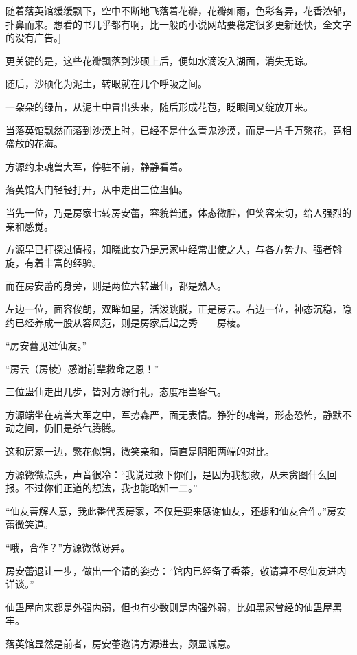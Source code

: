 
\begin{this_body}

随着落英馆缓缓飘下，空中不断地飞落着花瓣，花瓣如雨，色彩各异，花香浓郁，扑鼻而来。想看的书几乎都有啊，比一般的小说网站要稳定很多更新还快，全文字的没有广告。]

更关键的是，这些花瓣飘落到沙硕上后，便如水滴没入湖面，消失无踪。

随后，沙硕化为泥土，转眼就在几个呼吸之间。

一朵朵的绿苗，从泥土中冒出头来，随后形成花苞，眨眼间又绽放开来。

当落英馆飘然而落到沙漠上时，已经不是什么青鬼沙漠，而是一片千万繁花，竞相盛放的花海。

方源约束魂兽大军，停驻不前，静静看着。

落英馆大门轻轻打开，从中走出三位蛊仙。

当先一位，乃是房家七转房安蕾，容貌普通，体态微胖，但笑容亲切，给人强烈的亲和感觉。

方源早已打探过情报，知晓此女乃是房家中经常出使之人，与各方势力、强者斡旋，有着丰富的经验。

而在房安蕾的身旁，则是两位六转蛊仙，都是熟人。

左边一位，面容俊朗，双眸如星，活泼跳脱，正是房云。右边一位，神态沉稳，隐约已经养成一股从容风范，则是房家后起之秀――房棱。

“房安蕾见过仙友。”

“房云（房棱）感谢前辈救命之恩！”

三位蛊仙走出几步，皆对方源行礼，态度相当客气。

方源端坐在魂兽大军之中，军势森严，面无表情。狰狞的魂兽，形态恐怖，静默不动之间，仍旧是杀气腾腾。

这和房家一边，繁花似锦，微笑亲和，简直是阴阳两端的对比。

方源微微点头，声音很冷：“我说过救下你们，是因为我想救，从未贪图什么回报。不过你们正道的想法，我也能略知一二。”

“仙友善解人意，我此番代表房家，不仅是要来感谢仙友，还想和仙友合作。”房安蕾微笑道。

“哦，合作？”方源微微讶异。

房安蕾退让一步，做出一个请的姿势：“馆内已经备了香茶，敬请算不尽仙友进内详谈。”

仙蛊屋向来都是外强内弱，但也有少数则是内强外弱，比如黑家曾经的仙蛊屋黑牢。

落英馆显然是前者，房安蕾邀请方源进去，颇显诚意。


\end{this_body}

